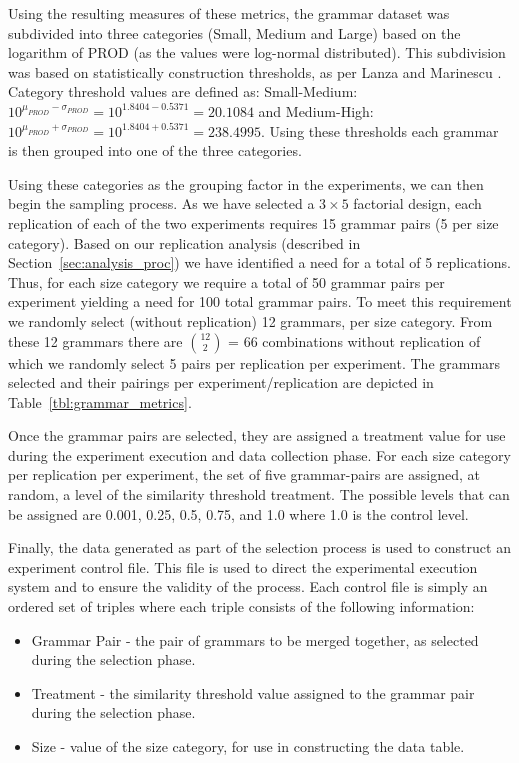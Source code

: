 \documentclass[conference]{IEEEtran}
\providecommand{\tightlist}{%
  \setlength{\itemsep}{0pt}\setlength{\parskip}{0pt}}
\begin{document}
Using the resulting measures of these metrics, the grammar dataset was
subdivided into three categories (Small, Medium and Large) based on the
logarithm of PROD (as the values were log-normal distributed). This
subdivision was based on statistically construction thresholds, as per
Lanza and Marinescu \cite{lanzaObjectorientedMetricsPractice2011}.
Category threshold values are defined as: Small-Medium:
\(10^{\mu_{PROD} - \sigma_{PROD}} = 10^{1.8404 - 0.5371} = 20.1084\) and
Medium-High:
\(10^{\mu_{PROD} + \sigma_{PROD}} = 10^{1.8404 + 0.5371} = 238.4995\).
Using these thresholds each grammar is then grouped into one of the
three categories.

Using these categories as the grouping factor in the experiments, we can
then begin the sampling process. As we have selected a \(3\times 5\)
factorial design, each replication of each of the two experiments
requires 15 grammar pairs (5 per size category). Based on our
replication analysis (described in Section~\ref{sec:analysis_proc}) we
have identified a need for a total of 5 replications. Thus, for each
size category we require a total of 50 grammar pairs per experiment
yielding a need for 100 total grammar pairs. To meet this requirement we
randomly select (without replication) 12 grammars, per size category.
From these 12 grammars there are \(12 \choose 2\) = 66 combinations
without replication of which we randomly select 5 pairs per replication
per experiment. The grammars selected and their pairings per
experiment/replication are depicted in Table~\ref{tbl:grammar_metrics}.

Once the grammar pairs are selected, they are assigned a treatment value
for use during the experiment execution and data collection phase. For
each size category per replication per experiment, the set of five
grammar-pairs are assigned, at random, a level of the similarity
threshold treatment. The possible levels that can be assigned are 0.001,
0.25, 0.5, 0.75, and 1.0 where 1.0 is the control level.

Finally, the data generated as part of the selection process is used to
construct an experiment control file. This file is used to direct the
experimental execution system and to ensure the validity of the process.
Each control file is simply an ordered set of triples where each triple
consists of the following information:

\begin{itemize}
\tightlist
\item
  Grammar Pair - the pair of grammars to be merged together, as selected
  during the selection phase.
\item
  Treatment - the similarity threshold value assigned to the grammar
  pair during the selection phase.
\item
  Size - value of the size category, for use in constructing the data
  table.
\end{itemize}
\end{document}
